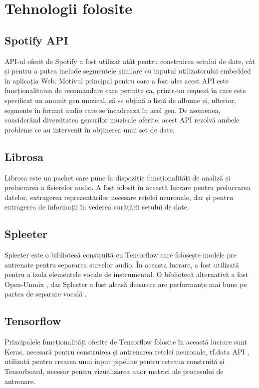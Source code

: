 \chapter{Tehnologii folosite}
\section{Spotify API}
API-ul oferit de Spotify \cite{spotifyapi} a fost utilizat atât pentru construirea setului de date, cât și pentru a putea include 
segmentele similare cu inputul utilizatorului embedded în aplicația Web. Motivul principal pentru care a fost ales
 acest API este funcționalitatea de recomandare care permite ca, printr-un request în care este specificat un
 anumit gen muzical, să se obțină o listă de albume și, ulterior, segmente în format audio care se 
încadrează în acel gen. De asemenea, considerând diversitatea genurilor muzicale oferite, 
acest API rezolvă ambele probleme ce au intervenit în obținerea unui set de date.
\section{Librosa}
Librosa \cite{librosa} este un pachet care pune la dispoziție funcționalități de analiză și prelucrarea a fișierelor audio. 
A fost folosit în această lucrare pentru prelucrarea datelor, extragerea reprezentărilor necesare rețelei neuronale, 
dar și pentru extragerea de informații în vederea curățării setului de date.
\section{Spleeter}
Spleeter \cite{spleeter} este o bibliotecă construită cu Tensorflow care folosește modele pre antrenate pentru separarea surselor audio. 
În aceasta lucrare, a fost utilizată pentru a izola elementele vocale de instrumental. O bibliotecă alternativă a fost 
Open-Unmix \cite{open-unmix}, dar Spleeter a fost aleasă deoarece are performanțe
 mai bune pe partea de separare vocală \cite{spleeter}.
\section{Tensorflow}
Principalele funcționalități oferite de Tensorflow \cite{tensorflow} folosite în această lucrare sunt Keras, necesară pentru construirea 
și antrenarea rețelei neuronale, tf.data API \cite{tf-data}, utilizată pentru crearea unui input pipeline pentru rețeaua construită și 
Tensorboard, necesar pentru vizualizarea unor metrici ale procesului de antrenare.
